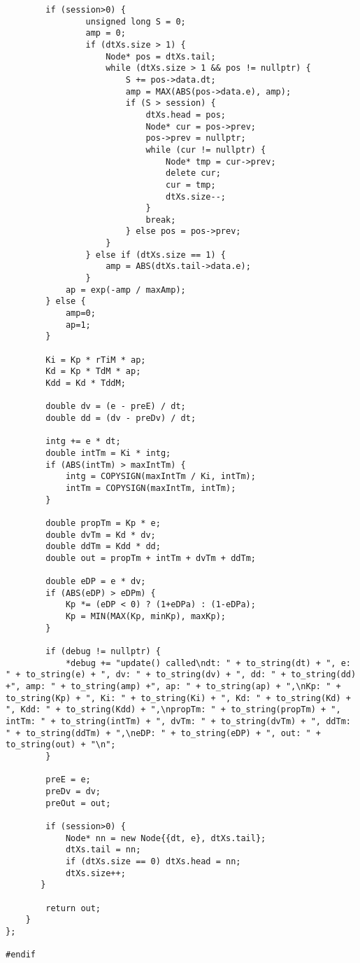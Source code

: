 \documentclass[a4paper,12pt]{report}
\begin{document}
\begin{lstlisting}
        if (session>0) {
                unsigned long S = 0;
                amp = 0;
                if (dtXs.size > 1) {
                    Node* pos = dtXs.tail;
                    while (dtXs.size > 1 && pos != nullptr) {
                        S += pos->data.dt;
                        amp = MAX(ABS(pos->data.e), amp);
                        if (S > session) {
                            dtXs.head = pos;
                            Node* cur = pos->prev;
                            pos->prev = nullptr;
                            while (cur != nullptr) {
                                Node* tmp = cur->prev;
                                delete cur;
                                cur = tmp;
                                dtXs.size--;
                            }
                            break;
                        } else pos = pos->prev;
                    }
                } else if (dtXs.size == 1) {
                    amp = ABS(dtXs.tail->data.e);
                }        
            ap = exp(-amp / maxAmp);
        } else {
            amp=0;
            ap=1;
        }

        Ki = Kp * rTiM * ap;
        Kd = Kp * TdM * ap;
        Kdd = Kd * TddM;

        double dv = (e - preE) / dt;
        double dd = (dv - preDv) / dt;

        intg += e * dt;
        double intTm = Ki * intg;
        if (ABS(intTm) > maxIntTm) {
            intg = COPYSIGN(maxIntTm / Ki, intTm);
            intTm = COPYSIGN(maxIntTm, intTm);
        }

        double propTm = Kp * e;
        double dvTm = Kd * dv;
        double ddTm = Kdd * dd;
        double out = propTm + intTm + dvTm + ddTm;

        double eDP = e * dv;
        if (ABS(eDP) > eDPm) {
            Kp *= (eDP < 0) ? (1+eDPa) : (1-eDPa);
            Kp = MIN(MAX(Kp, minKp), maxKp);
        }

        if (debug != nullptr) {
            *debug += "update() called\ndt: " + to_string(dt) + ", e: " + to_string(e) + ", dv: " + to_string(dv) + ", dd: " + to_string(dd) +", amp: " + to_string(amp) +", ap: " + to_string(ap) + ",\nKp: " + to_string(Kp) + ", Ki: " + to_string(Ki) + ", Kd: " + to_string(Kd) + ", Kdd: " + to_string(Kdd) + ",\npropTm: " + to_string(propTm) + ", intTm: " + to_string(intTm) + ", dvTm: " + to_string(dvTm) + ", ddTm: " + to_string(ddTm) + ",\neDP: " + to_string(eDP) + ", out: " + to_string(out) + "\n";
        }

        preE = e;
        preDv = dv;
        preOut = out;

        if (session>0) {
            Node* nn = new Node{{dt, e}, dtXs.tail};
            dtXs.tail = nn;
            if (dtXs.size == 0) dtXs.head = nn;
            dtXs.size++;
       } 

        return out;
    }
};

#endif
\end{lstlisting}
\end{document}
